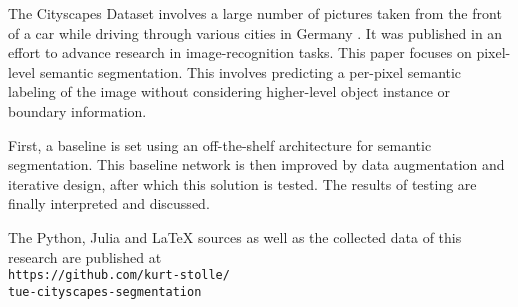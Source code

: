 The Cityscapes Dataset involves a large number of pictures taken from the front of a car while driving through various cities in Germany \cite{Cordts2016Cityscapes}. It was published in an effort to advance research in image-recognition tasks. This paper focuses on pixel-level semantic segmentation. This involves predicting a per-pixel semantic labeling of the image without considering higher-level object instance or boundary information.

First, a baseline is set using an off-the-shelf architecture for semantic segmentation.
This baseline network is then improved by data augmentation and iterative design, after which this solution is tested.
The results of testing are finally interpreted and discussed.

The Python, Julia and LaTeX sources as well as the collected data of this research are published at
\texttt{\\https://github.com/kurt-stolle/\\     tue-cityscapes-segmentation}